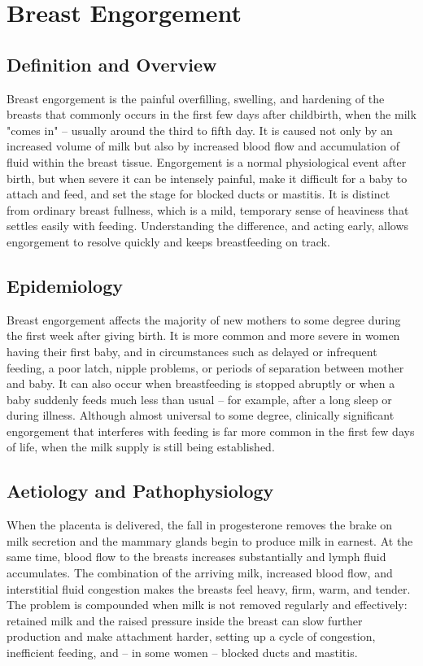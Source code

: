 \chapter{Breast Engorgement}

\section*{Definition and Overview}
Breast engorgement is the painful overfilling, swelling, and hardening of the breasts that commonly occurs in the first few days after childbirth, when the milk "comes in" -- usually around the third to fifth day. It is caused not only by an increased volume of milk but also by increased blood flow and accumulation of fluid within the breast tissue. Engorgement is a normal physiological event after birth, but when severe it can be intensely painful, make it difficult for a baby to attach and feed, and set the stage for blocked ducts or mastitis. It is distinct from ordinary breast fullness, which is a mild, temporary sense of heaviness that settles easily with feeding. Understanding the difference, and acting early, allows engorgement to resolve quickly and keeps breastfeeding on track.

\section*{Epidemiology}
Breast engorgement affects the majority of new mothers to some degree during the first week after giving birth. It is more common and more severe in women having their first baby, and in circumstances such as delayed or infrequent feeding, a poor latch, nipple problems, or periods of separation between mother and baby. It can also occur when breastfeeding is stopped abruptly or when a baby suddenly feeds much less than usual -- for example, after a long sleep or during illness. Although almost universal to some degree, clinically significant engorgement that interferes with feeding is far more common in the first few days of life, when the milk supply is still being established.

\section*{Aetiology and Pathophysiology}
When the placenta is delivered, the fall in progesterone removes the brake on milk secretion and the mammary glands begin to produce milk in earnest. At the same time, blood flow to the breasts increases substantially and lymph fluid accumulates. The combination of the arriving milk, increased blood flow, and interstitial fluid congestion makes the breasts feel heavy, firm, warm, and tender. The problem is compounded when milk is not removed regularly and effectively: retained milk and the raised pressure inside the breast can slow further production and make attachment harder, setting up a cycle of congestion, inefficient feeding, and -- in some women -- blocked ducts and mastitis.

